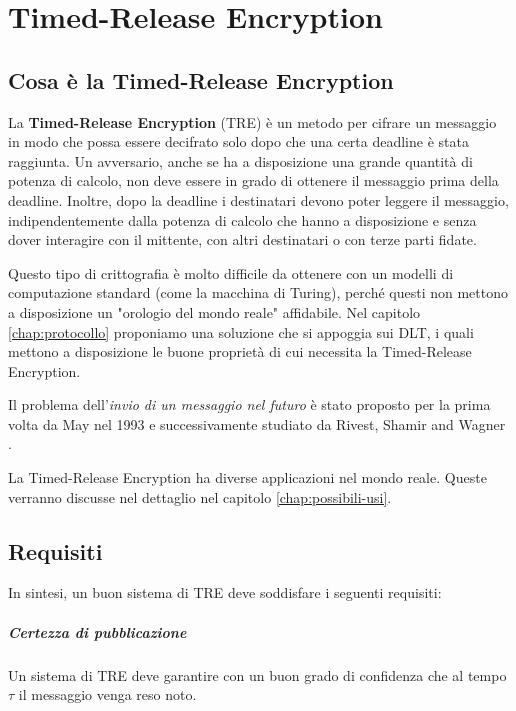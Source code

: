 \chapter{Timed-Release Encryption}

\section{Cosa è la Timed-Release Encryption}
La \textbf{Timed-Release Encryption} (TRE)
è un metodo per cifrare un messaggio in modo che possa
essere decifrato solo dopo che una certa deadline è stata raggiunta.
Un avversario, anche se ha a disposizione una grande quantità di potenza di calcolo,
non deve essere in grado di ottenere il messaggio prima della deadline.
Inoltre, dopo la deadline i destinatari devono poter leggere il messaggio,
indipendentemente dalla potenza di calcolo che hanno a disposizione e
senza dover interagire con il mittente,
con altri destinatari o con terze parti fidate.

Questo tipo di crittografia è molto difficile da ottenere con un modelli
di computazione standard (come la macchina di Turing), perché questi non mettono
a disposizione un "orologio del mondo reale" affidabile.
Nel capitolo \ref{chap:protocollo} proponiamo una soluzione che si appoggia sui DLT,
i quali mettono a disposizione
le buone proprietà di cui necessita la Timed-Release Encryption.

Il problema dell'\textit{invio di un messaggio nel futuro} è stato proposto per la prima volta
da May \cite{May:time-released-crypto} nel 1993 e
successivamente studiato da Rivest, Shamir and Wagner \cite{Rivest96time-lockpuzzles}.

La Timed-Release Encryption ha diverse applicazioni nel mondo reale. Queste verranno
discusse nel dettaglio nel capitolo \ref{chap:possibili-usi}.

\section{Requisiti}
In sintesi, un buon sistema di TRE deve soddisfare i seguenti requisiti:

\paragraph{Certezza di pubblicazione}
\label{parag:certezza-pubblicazione}
Un sistema di TRE deve garantire con un buon
grado di confidenza che al tempo $ \tau $ il messaggio venga reso noto.

